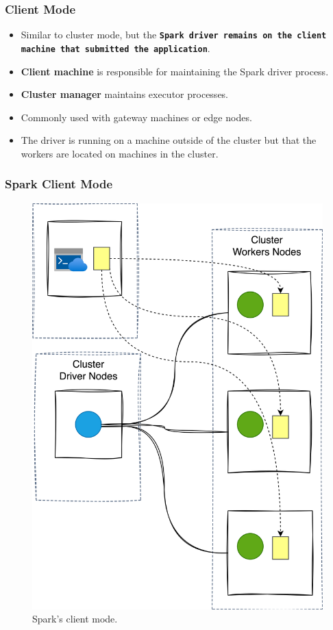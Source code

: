 %
\begin{frame}
    \frametitle{Client Mode}
    \begin{itemize}
        \item Similar to cluster mode, but the \textbf{\texttt{Spark driver remains on the client
        machine that submitted the application}}.
        \item \textbf{Client machine} is responsible for maintaining the Spark driver process.
        \item \textbf{Cluster manager} maintains executor processes.
        \item Commonly used with gateway machines or edge nodes.
        \item The driver is running on a machine outside of the cluster but that the workers are located on machines in the cluster.
    \end{itemize}
\end{frame}
%
\begin{frame}
    \frametitle{Spark Client Mode}
    \begin{figure}
        \includegraphics[width=\textwidth,height=.7\textheight,keepaspectratio]{./Figures/chapter-04/spark_client_mode}
        \caption{Spark’s client mode.}\label{fig:client_mode}
    \end{figure}
\end{frame}

